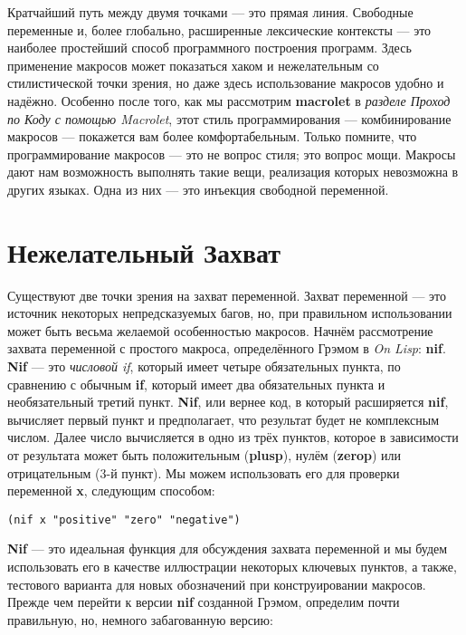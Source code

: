 Кратчайший путь между двумя точками --- это прямая линия. Свободные переменные и, более глобально, расширенные лексические контексты --- это наиболее простейший способ программного построения программ. Здесь применение макросов может показаться хаком и нежелательным со стилистической точки зрения, но даже здесь использование макросов удобно и надёжно. Особенно после того, как мы рассмотрим \textbf{macrolet} в \emph{разделе Проход по Коду с помощью Macrolet}, этот стиль программирования --- комбинирование макросов --- покажется вам более комфортабельным. Только помните, что программирование макросов --- это не вопрос стиля; это вопрос мощи. Макросы дают нам возможность выполнять такие вещи, реализация которых невозможна в других языках. Одна из них --- это инъекция свободной переменной.

\section{Нежелательный Захват}\label{section_unwanted_capture}

Существуют две точки зрения на захват переменной. Захват переменной --- это источник некоторых непредсказуемых багов, но, при правильном использовании может быть весьма желаемой особенностью макросов. Начнём рассмотрение захвата переменной с простого макроса, определённого Грэмом в \emph{On Lisp}: \textbf{nif}. \textbf{Nif} --- это \emph{числовой if}, который имеет четыре обязательных пункта, по сравнению с обычным \textbf{if}, который имеет два обязательных пункта и необязательный третий пункт. \textbf{Nif}, или вернее код, в который расширяется \textbf{nif}, вычисляет первый пункт и предполагает, что результат будет не комплексным числом. Далее число вычисляется в одно из трёх пунктов, которое в зависимости от результата может быть положительным (\textbf{plusp}), нулём (\textbf{zerop}) или отрицательным (3-й пункт). Мы можем использовать его для проверки переменной \textbf{x}, следующим способом:

\begin{verbatim}
(nif x "positive" "zero" "negative")
\end{verbatim}

 \textbf{Nif} --- это идеальная функция для обсуждения захвата переменной и мы будем использовать его в качестве иллюстрации некоторых ключевых пунктов, а также, тестового варианта для новых обозначений при конструировании макросов. Прежде чем перейти к версии \textbf{nif} созданной Грэмом, определим почти правильную, но, немного забагованную версию:

